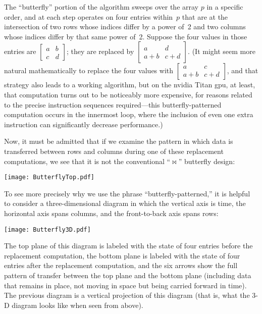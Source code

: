 \documentclass[10pt,nohyperref]{sigplanconf}
\begin{document}
The ``butterfly'' portion of the algorithm sweeps over the array $p$ in a specific order,
and at each step
operates on four entries within~$p$ that are at the intersection of two rows whose indices differ by a power of~2
and two columns whose indices differ by that same power of~2.  Suppose the four values in those entries are
$\left[ \begin{array}{c|c}a & b \\\hline c & d\end{array} \right]$; they are replaced by
$\left[ \begin{array}{c|c}a & d \\\hline a+b & c+d\end{array} \right]$.
(It might seem more natural mathematically to replace
the four values with $\left[ \begin{array}{c|c}a & c \\\hline a+b & c+d\end{array} \right]$,
and that strategy also leads to a working algorithm,
but on the {\sc nvidia} Titan {\sc gpu}, at least, that computation turns out to be noticeably more expensive,
for reasons related to the precise instruction sequences required---this butterfly-patterned computation
occurs in the innermost loop, where the inclusion of even one extra instruction can significantly decrease performance.)

\newcommand\replace[4]{\hbox{$\mathcal{R}[#1,#2;#3,#4]$}}

\newcommand\diagramshrinktop{\vskip-5pt }
\newcommand\diagramshrink{\vskip-7pt }

Now, it must be admitted that if we examine the pattern in which data is transferred between rows and
columns during one of these replacement computations, we see that it is not the conventional ``$\displaystyle\Join$'' butterfly design:
\begin{center}
\vbox{\diagramshrinktop\texttt{[image: ButterflyTop.pdf]}\diagramshrink}
\end{center}
To see more precisely why we use the phrase ``butterfly-patterned,'' it is helpful to consider a three-dimensional diagram
in which the vertical axis is time, the horizontal axis spans columns, and the front-to-back axis spans rows:
\begin{center}
\vbox{\diagramshrinktop\texttt{[image: Butterfly3D.pdf]}\diagramshrink}
\end{center}
The top plane of this diagram is labeled with the state of four entries before the replacement computation,
the bottom plane is labeled with the state of four entries after the replacement computation,
and the six arrows show the full pattern of transfer between the top plane and the bottom plane
(including data that remains in place, not moving in space but being carried forward in time).
The previous diagram is a vertical projection of this diagram (that is, what the 3-D diagram looks like when seen from above).
\end{document}
